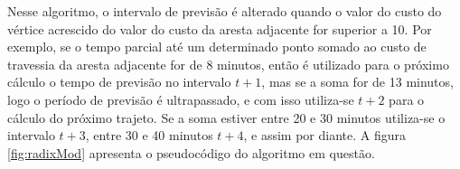Nesse algoritmo, o intervalo de previsão é alterado quando o valor do custo do vértice acrescido
do valor do custo da aresta adjacente for superior a 10.
Por exemplo, se o tempo parcial até um determinado ponto somado ao custo de travessia da aresta adjacente for de 8 minutos, então
é utilizado para o próximo cálculo o tempo de previsão no intervalo $t + 1$, mas se a soma for de 13 minutos, logo
o período de previsão é ultrapassado, e com isso utiliza-se $t + 2$ para o cálculo do próximo trajeto. Se a soma
estiver entre 20 e 30 minutos utiliza-se o intervalo $t + 3$, entre 30 e 40 minutos $t + 4$, e assim por diante.
A figura \ref{fig:radixMod} apresenta o pseudocódigo do algoritmo em questão.
\FloatBarrier
{}
